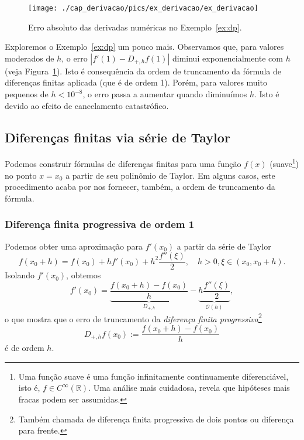\begin{figure}
  \centering
  \texttt{[image: ./cap\_derivacao/pics/ex\_derivacao/ex\_derivacao]}
  \caption{Erro absoluto das derivadas numéricas no Exemplo~\ref{ex:dp}.}
  \label{fig:ex_derivacao}
\end{figure}

Exploremos o Exemplo~\ref{ex:dp} um pouco mais. Observamos que, para valores moderados de $h$, o erro $|f'(1)-D_{+,h}f(1)|$ diminui exponencialmente com $h$ (veja Figura~\ref{fig:ex_derivacao}). Isto é consequência da ordem de truncamento da fórmula de diferenças finitas aplicada (que é de ordem 1). Porém, para valores muito pequenos de $h < 10^{-8}$, o erro passa a aumentar quando diminuímos $h$. Isto é devido ao efeito de cancelamento catastrófico.

\subsection{Diferenças finitas via série de Taylor}

Podemos construir fórmulas de diferenças finitas para uma função $f(x)$ (suave\footnote{Uma função suave é uma função infinitamente continuamente diferenciável, isto é, $f\in C^\infty(\mathbb{R})$. Uma análise mais cuidadosa, revela que hipóteses mais fracas podem ser assumidas.}) no ponto $x = x_0$ a partir de seu polinômio de Taylor. Em alguns casos, este procedimento acaba por nos fornecer, também, a ordem de truncamento da fórmula.

\subsubsection{Diferença finita progressiva de ordem 1}
Podemos obter uma aproximação para $f'(x_0)$ a partir da série de Taylor
\begin{equation}
  f(x_0+h) = f(x_0) + hf'(x_0) + h^2\frac{f''(\xi)}{2},\quad h>0, \xi\in(x_0,x_0+h).
\end{equation}
Isolando $f'(x_0)$, obtemos
\begin{equation}\label{eq:dp_trunc}
  f'(x_0) = \underbrace{\frac{f(x_0+h) - f(x_0)}{h}}_{D_{+,h}} - \underbrace{h\frac{f''(\xi)}{2}}_{\mathcal{O}(h)},
\end{equation}
o que mostra que o erro de truncamento da \emph{diferença finita progressiva}\footnote{Também chamada de diferença finita progressiva de dois pontos ou diferença para frente.}
\begin{equation}
  D_{+,h}f(x_0) := \frac{f(x_0+h)-f(x_0)}{h}
\end{equation}
é de ordem $h$.

